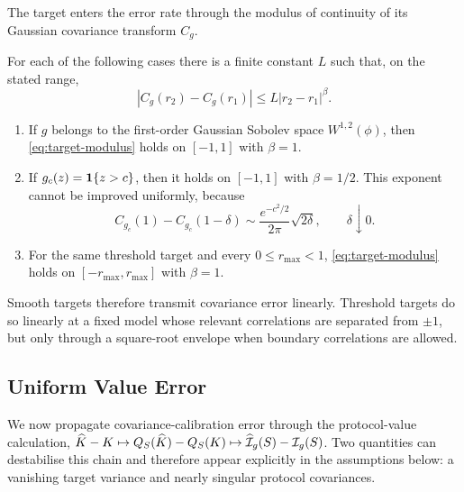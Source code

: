The target enters the error rate through the modulus of continuity of its
Gaussian covariance transform $C_g$.

\begin{proposition}
\label{prop:regularity}
For each of the following cases there is a finite constant $L$ such that, on
the stated range,
\begin{equation}
|C_g(r_2)-C_g(r_1)|\le L|r_2-r_1|^\beta.
\label{eq:target-modulus}
\end{equation}
\begin{enumerate}[label=(\roman*),leftmargin=2.2em,itemsep=2pt]
\item\label{lem:lipschitz} If $g$ belongs to the first-order Gaussian Sobolev
space $W^{1,2}(\phi)$, then
\eqref{eq:target-modulus} holds on $[-1,1]$ with $\beta=1$.
\item\label{lem:holder} If $g_c(z)=\mathbf{1}\{z>c\}$, then it holds on $[-1,1]$
with $\beta=1/2$. This exponent cannot be improved uniformly, because
\begin{equation}
C_{g_c}(1)-C_{g_c}(1-\delta)
\sim \frac{e^{-c^2/2}}{2\pi}\sqrt{2\delta},
\qquad \delta\downarrow0.
\label{eq:boundary-asymptotic}
\end{equation}
\item\label{lem:local-lipschitz} For the same threshold target and every
$0\le r_{\max}<1$, \eqref{eq:target-modulus} holds on
$[-r_{\max},r_{\max}]$ with $\beta=1$.
\end{enumerate}
\end{proposition}

Smooth targets therefore transmit covariance error linearly. Threshold targets
do so linearly at a fixed model whose relevant correlations are separated from
$\pm1$, but only through a square-root envelope when boundary correlations are
allowed.

\subsection{Uniform Value Error}

We now propagate covariance-calibration error through the protocol-value
calculation,
$\widehat K-K\mapsto Q_S(\widehat K)-Q_S(K)\mapsto
\widehat{\mathcal{I}}_g(S)-\mathcal{I}_g(S)$. Two quantities can destabilise this chain and
therefore appear explicitly in the assumptions below: a vanishing target
variance and nearly singular protocol covariances.

